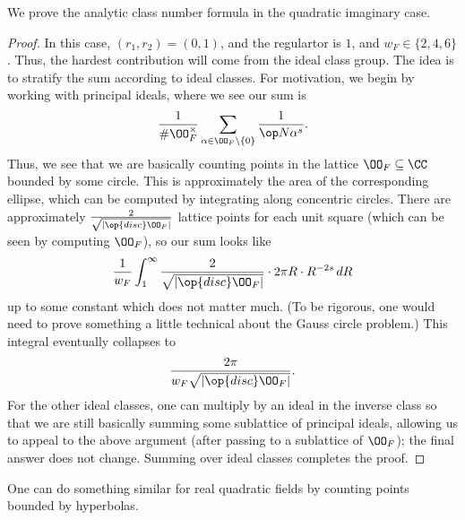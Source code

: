 \documentclass{article}
\begin{document}
\begin{proposition}
	We prove the analytic class number formula in the quadratic imaginary case.
\end{proposition}
\begin{proof}
	In this case, $(r_1,r_2)=(0,1)$, and the regulartor is $1$, and $w_F\in\{2,4,6\}$. Thus, the hardest contribution will come from the ideal class group. The idea is to stratify the sum according to ideal classes. For motivation, we begin by working with principal ideals, where we see our sum is
	\[\frac1{\#\OO_F^\times}\sum_{\alpha\in\OO_F\setminus\{0\}}\frac1{\op N\alpha^s}.\]
	Thus, we see that we are basically counting points in the lattice $\OO_F\subseteq\CC$ bounded by some circle. This is approximately the area of the corresponding ellipse, which can be computed by integrating along concentric circles. There are approximately $\frac2{\sqrt{\left|\op{disc}\OO_F\right|}}$ lattice points for each unit square (which can be seen by computing $\OO_F$), so our sum looks like
	\[\frac1{w_F}\int_1^\infty\frac2{\sqrt{\left|\op{disc}\OO_F\right|}}\cdot2\pi R\cdot R^{-2s}\,dR\]
	up to some constant which does not matter much. (To be rigorous, one would need to prove something a little technical about the Gauss circle problem.) This integral eventually collapses to
	\[\frac{2\pi}{w_F\sqrt{\left|\op{disc}\OO_F\right|}}.\]
	For the other ideal classes, one can multiply by an ideal in the inverse class so that we are still basically summing some sublattice of principal ideals, allowing us to appeal to the above argument (after passing to a sublattice of $\OO_F$); the final answer does not change. Summing over ideal classes completes the proof.
\end{proof}
\begin{remark}
	One can do something similar for real quadratic fields by counting points bounded by hyperbolas.
\end{remark}
\end{document}
